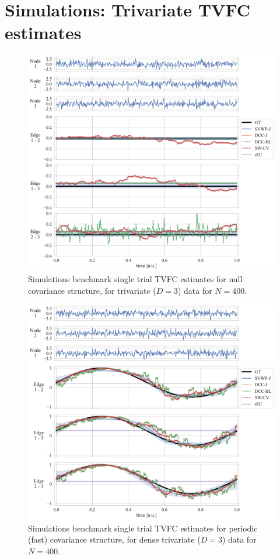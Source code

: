 \clearpage
\section{Simulations: Trivariate TVFC estimates}\label{ch:appendix-d3-tvfc-estimates}


\begin{figure}[ht]
  \centering
  \includegraphics[width=\textwidth]{fig/sim/d3s/N0400_T0003/no_noise/null_correlations}
  \caption{
    Simulations benchmark single trial TVFC estimates for null covariance structure, for trivariate ($D = 3$) data for $N = 400$.
  }\label{fig:results-d3-no-noise-null-covariance}
\end{figure}


\begin{figure}[ht]
  \centering
  \includegraphics[width=\textwidth]{fig/sim/d3d/N0400_T0003/no_noise/periodic_1_correlations}
  \caption{
    Simulations benchmark single trial TVFC estimates for periodic (fast) covariance structure, for dense trivariate ($D = 3$) data for $N = 400$.
  }\label{fig:results-d3s-no-noise-periodic-3-covariance}
\end{figure}


